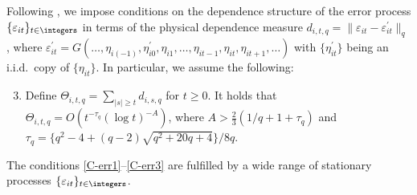 Following \cite{Wu2005}, we impose conditions on the dependence structure of the error process $\{\varepsilon_{it}\}_{t\in\integers}$ in terms of the physical dependence measure $d_{i, t,q} = \| \varepsilon_{it} - \varepsilon_{it}^\prime \|_q$, where $\varepsilon_{it}^\prime = G(\ldots,\eta_{i(-1)},\eta_{i0}^\prime,\eta_{i1},\ldots,\eta_{it-1},\eta_{it},\eta_{it+1},\ldots)$ with $\{\eta_{it}^\prime\}$ being an i.i.d.\ copy of $\{\eta_{it}\}$. In particular, we assume the following: 
\begin{enumerate}[label=(C\arabic*),leftmargin=1.05cm]
\setcounter{enumi}{2}

\item \label{C-err3} Define $\Theta_{i, t,q} = \sum\nolimits_{|s| \ge t} d_{i, s,q}$ for $t \ge 0$. It holds that 
$\Theta_{i, t,q} = O ( t^{-\tau_q} (\log t)^{-A} )$,  
where $A > \frac{2}{3} (1/q + 1 + \tau_q)$ and $\tau_q = \{q^2 - 4 + (q-2) \sqrt{q^2 + 20q + 4}\} / 8q$. 

\end{enumerate}
The conditions \ref{C-err1}--\ref{C-err3} are fulfilled by a wide range of stationary processes $\{\varepsilon_{it}\}_{t\in\integers}$.%


